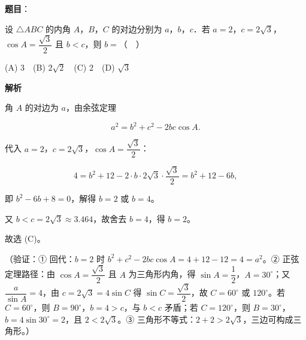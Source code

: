 \begin{answer}

\textbf{题目}：

设 \(\triangle ABC\) 的内角 \(A\)，\(B\)，\(C\) 的对边分别为 \(a\)，\(b\)，\(c\)．若 \(a=2\)，\(c=2\sqrt{3}\)，\(\cos A=\dfrac{\sqrt{3}}{2}\) 且 \(b<c\)，则 \(b=\)（　）

(A) \(3\)　(B) \(2\sqrt{2}\)　(C) \(2\)　(D) \(\sqrt{3}\)

\textbf{解析}

角 \(A\) 的对边为 \(a\)，由余弦定理

\nopagebreak[4]
\[
a^2=b^2+c^2-2bc\cos A.
\]

代入 \(a=2\)，\(c=2\sqrt{3}\)，\(\cos A=\dfrac{\sqrt{3}}{2}\)：

\nopagebreak[4]
\[
4=b^2+12-2\cdot b\cdot 2\sqrt{3}\cdot\dfrac{\sqrt{3}}{2}=b^2+12-6b,
\]

即 \(b^2-6b+8=0\)，解得 \(b=2\) 或 \(b=4\)。

又 \(b<c=2\sqrt{3}\approx 3.464\)，故舍去 \(b=4\)，得 \(b=2\)。

故选 (C)。

（验证：① 回代：\(b=2\) 时 \(b^2+c^2-2bc\cos A=4+12-12=4=a^2\)。② 正弦定理路径：由 \(\cos A=\dfrac{\sqrt{3}}{2}\) 且 \(A\) 为三角形内角，得 \(\sin A=\dfrac{1}{2}\)，\(A=30^\circ\)；又 \(\dfrac{a}{\sin A}=4\)，由 \(c=2\sqrt{3}=4\sin C\) 得 \(\sin C=\dfrac{\sqrt{3}}{2}\)，故 \(C=60^\circ\) 或 \(120^\circ\)。若 \(C=60^\circ\)，则 \(B=90^\circ\)，\(b=4>c\)，与 \(b<c\) 矛盾；若 \(C=120^\circ\)，则 \(B=30^\circ\)，\(b=4\sin 30^\circ=2\)，且 \(2<2\sqrt{3}\)。③ 三角形不等式：\(2+2>2\sqrt{3}\)，三边可构成三角形。）


\end{answer}
